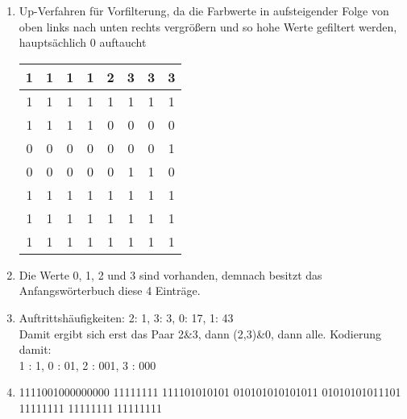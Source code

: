 \documentclass[a4paper,10pt]{article}
\begin{document}
\kopf
\renewcommand{\figurename}{Figure}

\begin{enumerate}
\item
Up-Verfahren für Vorfilterung, da die Farbwerte in aufsteigender Folge von oben links nach unten rechts vergrößern und so hohe Werte gefiltert werden, hauptsächlich 0 auftaucht \\
\begin{tabular}{|c|c|c|c|c|c|c|c|}
\hline
1&1&1&1&2&3&3&3 \\
\hline
1&1&1&1&1&1&1&1 \\
\hline
1&1&1&1&0&0&0&0 \\
\hline
0&0&0&0&0&0&0&1 \\
\hline
0&0&0&0&0&1&1&0 \\
\hline
1&1&1&1&1&1&1&1 \\
\hline
1&1&1&1&1&1&1&1 \\
\hline
1&1&1&1&1&1&1&1 \\
\hline
\end{tabular}
\item Die Werte 0, 1, 2 und 3 sind vorhanden, demnach besitzt das Anfangswörterbuch diese 4 Einträge.
\item Auftrittshäufigkeiten:
2: 1, 3: 3, 0: 17, 1: 43 \\
Damit ergibt sich erst das Paar 2\&3, dann (2,3)\&0, dann alle. Kodierung damit: \\
1 : 1,
0 : 01,
2 : 001,
3 : 000
\item
1111001000000000 11111111 111101010101 010101010101011 01010101011101 11111111 11111111 11111111 
\end{enumerate}
\end{document}
